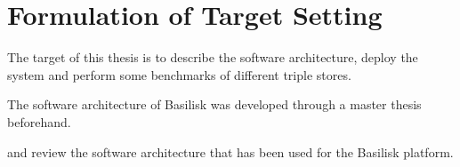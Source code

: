 \chapter{Formulation of Target Setting}
\label{ch:target_setting}

The target of this thesis is to describe the software architecture, deploy the system and perform some benchmarks of different triple stores.



The software architecture of Basilisk was developed through a master thesis beforehand. 

 and review the software architecture that has been used for the Basilisk platform.



%
%
%
